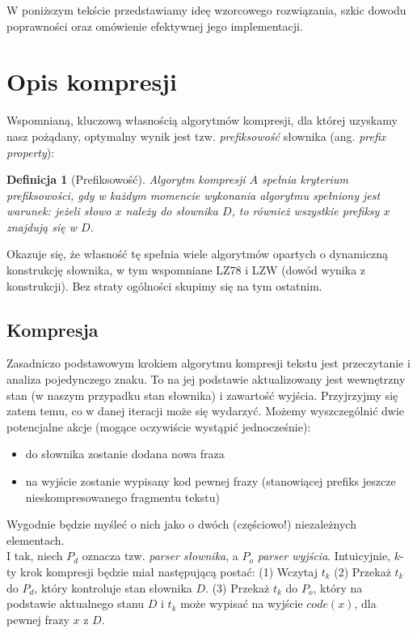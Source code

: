 \documentclass[12pt]{article}
\theoremstyle{plain}
\newtheorem{definition}{Definicja}[]
\begin{document}
W poniższym tekście przedstawiamy ideę wzorcowego rozwiązania, szkic dowodu poprawności oraz omówienie efektywnej jego implementacji.
\newpage

\section{Opis kompresji}
Wspomnianą, kluczową własnością algorytmów kompresji, dla której uzyskamy nasz pożądany, optymalny wynik jest tzw. \textit{prefiksowość} słownika (ang. \textit{prefix property}):

\theoremstyle{definition}
\begin{definition}[Prefiksowość]
Algorytm kompresji $A$ spełnia kryterium prefiksowości, gdy w każdym momencie wykonania algorytmu spełniony jest warunek: jeżeli słowo $x$ należy do słownika $D$, to również wszystkie prefiksy $x$ znajdują się w $D$.
\end{definition}

Okazuje się, że własność tę spełnia wiele algorytmów opartych o dynamiczną konstrukcję słownika, w tym wspomniane LZ78 i LZW (dowód wynika z konstrukcji). Bez straty ogólności skupimy się na tym ostatnim.
\subsection{Kompresja}

Zasadniczo podstawowym krokiem algorytmu kompresji tekstu jest przeczytanie i analiza pojedynczego znaku. To na jej podstawie aktualizowany jest wewnętrzny stan (w naszym przypadku stan słownika) i zawartość wyjścia. Przyjrzyjmy się zatem temu, co w danej iteracji może się wydarzyć. Możemy wyszczególnić dwie potencjalne akcje (mogące oczywiście wystąpić jednocześnie):
\begin{itemize}
    \item do słownika zostanie dodana nowa fraza
    \item na wyjście zostanie wypisany kod pewnej frazy (stanowiącej prefiks jeszcze nieskompresowanego fragmentu tekstu)
\end{itemize}

Wygodnie będzie myśleć o nich jako o dwóch (częściowo!) niezależnych elementach.\\
I tak, niech $P_{d}$ oznacza tzw. \textit{parser słownika}, a $P_{o}$ \textit{parser wyjścia}.
Intuicyjnie, $k$-ty krok kompresji będzie miał następującą postać:
(1) Wczytaj $t_{k}$
(2) Przekaż $t_{k}$ do $P_{d}$, który kontroluje stan słownika $D$.
(3) Przekaż $t_{k}$ do $P_{o}$, który na podstawie aktualnego stanu $D$ i $t_{k}$ może wypisać na wyjście $code(x)$, dla pewnej frazy $x$ z $D$.
\end{document}
